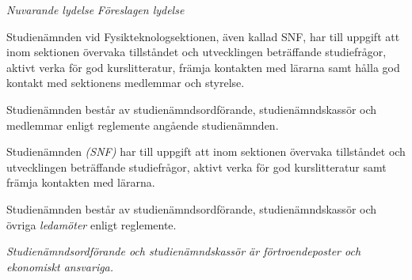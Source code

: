 \documentclass{article}
\newenvironment{lydelse}
    {\begin{paracol}{2}%
        \emph{Nuvarande lydelse}%
        \switchcolumn%
        \emph{Föreslagen lydelse}%
    \end{paracol}%
    \begin{enumerate}[label=\thesubsection.\arabic*]%
    \begin{paracol}{2}%
    }{\end{paracol}\end{enumerate}}
\begin{document}
\begin{lydelse}
  \setcounter{section}{8}
  \setcounter{subsection}{1}
  \item Studienämnden vid Fysikteknologsektionen, även kallad SNF, har till uppgift att inom sektionen övervaka tillståndet och utvecklingen beträffande studiefrågor, aktivt verka för god kurslitteratur, främja kontakten med lärarna samt hålla god kontakt med sektionens medlemmar och styrelse.

  \setcounter{section}{8}
  \setcounter{subsection}{2}
  \item Studienämnden består av studienämndsordförande, studienämndskassör och medlemmar enligt reglemente angående studienämnden.
\switchcolumn
  \setcounter{section}{7}
  \item Studienämnden \emph{(SNF)} har till uppgift att inom sektionen övervaka tillståndet och utvecklingen beträffande studiefrågor, aktivt verka för god kurslitteratur samt främja kontakten med lärarna.
  
  \item Studienämnden består av studienämndsordförande, studienämndskassör och övriga \emph{ledamöter} enligt reglemente.

  \item \emph{Studienämndsordförande och studienämndskassör är förtroendeposter och ekonomiskt ansvariga.}
\end{lydelse}
\setcounter{section}{7}
\setcounter{subsection}{0}

\end{document}
